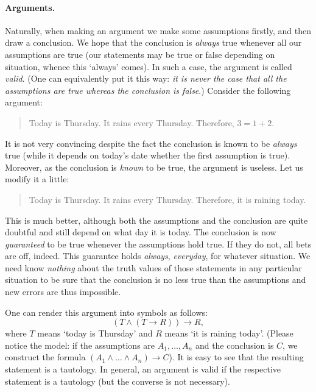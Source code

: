 \documentclass[12pt,notitlepage]{article}
\theoremstyle{plain}
\theoremstyle{definition}
\theoremstyle{plain}
\newcommand{\1}{\mathbf{1}}
\newcommand{\0}{\mathbf{0}}
\newcommand{\mcomm}[1]{}
\begin{document}
\paragraph{Arguments.} Naturally, when making an argument we make some assumptions firstly, and then draw a conclusion. We hope that the conclusion is \emph{always} true whenever all our assumptions are true (our statements may be true or false depending on situation, whence this `always' comes). In such a case, the argument is called \emph{valid}. (One can equivalently put it this way: \emph{it is never the case that all the assumptions are true whereas the conclusion is false}.) Consider the following argument:
\begin{quote}
Today is Thursday. It rains every Thursday. Therefore, $3 = 1 + 2$.
\end{quote}
It is not very convincing despite the fact the conclusion is known to be \emph{always} true (while it depends on today's date whether the first assumption is true). Moreover, as the conclusion is \emph{known} to be true, the argument is useless. Let us modify it a little:
\begin{quote}
Today is Thursday. It rains every Thursday. Therefore, it is raining today.
\end{quote}
This is much better, although both the assumptions and the conclusion are quite doubtful and still depend on what day it is today. The conclusion is now \emph{guaranteed} to be true whenever the assumptions hold true. If they do not, all bets are off, indeed. This guarantee holds \emph{always}, \emph{everyday}, for whatever situation. We need know \emph{nothing} about the truth values of those statements in any particular situation to be sure that the conclusion is no less true than the assumptions and new errors are thus impossible. 

\mcomm{It is not easy to clarify the implied universal quantifier in our `definition' of validity. To demonstrate the phenomenon of `semantic validity' (i.\,e., due to the logical form only), the Instructor could use statements whose `real-world' truth is `uncertain' (see argument examples from the next lecture).}

One can render this argument into symbols as follows:
$$(T \wedge (T \to R)) \to R,$$
where $T$ means `today is Thursday' and $R$ means `it is raining today'. (Please notice the model: if the assumptions are $A_1, \ldots, A_n$ and the conclusion is $C$, we construct the formula $(A_1 \wedge  \ldots \wedge A_n) \to C$). It is easy to see that the resulting statement is a tautology. In general, an argument is valid if the respective statement is a tautology (but the converse is not necessary).
\end{document}
